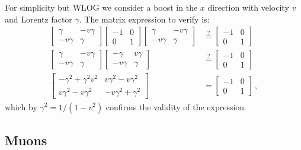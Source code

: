 \documentclass[main.tex]{subfiles}
\begin{document}
For simplicity but WLOG we consider a boost in the \(x\) direction with velocity \(v\) and Lorentz factor \(\gamma\). The matrix expression to verify is:
%
\begin{subequations}
\begin{align}
  \begin{bmatrix}
  \gamma    & - v \gamma  \\
    -v \gamma & \gamma
  \end{bmatrix}
  \begin{bmatrix}
    -1 & 0 \\
    0 & 1
  \end{bmatrix}
  \begin{bmatrix}
    \gamma & -v \gamma \\
     -v \gamma&  \gamma
  \end{bmatrix}
  &\overset{?}{=}
  \begin{bmatrix}
  -1   & 0 \\
  0   & 1
\end{bmatrix} \\
  \begin{bmatrix}
  \gamma    & - v \gamma  \\
    -v \gamma & \gamma
  \end{bmatrix}
  \begin{bmatrix}
    -\gamma & v \gamma \\
    -v \gamma&  \gamma
  \end{bmatrix}
  &\overset{?}{=}
  \begin{bmatrix}
  -1   & 0 \\
  0   & 1
\end{bmatrix} \\
  \begin{bmatrix}
  -\gamma^2 + \gamma^2 v^2    & v \gamma^2 - v \gamma^2  \\
    v \gamma^2 -v \gamma^2 & -v\gamma^2 +\gamma^2
  \end{bmatrix}
  &=
  \begin{bmatrix}
  -1   & 0 \\
  0   & 1
\end{bmatrix}\,,
\end{align}
\end{subequations}
%
which by \(\gamma^2 = 1/ (1-v^2)\) confirms the validity of the expression.

\subsection{Muons}
\end{document}
